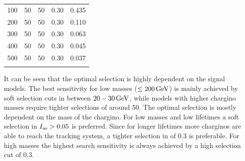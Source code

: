 \begin{table}[!h]
{\begin{tabular}{c |c| c| c| c}
\midrule
100&                     50&                      50&                      0.30&                    0.435\\ 
200&                     50&                      50&                      0.30&                    0.110\\ 
300&                     50&                      50&                      0.30&                    0.063\\ 
400&                     50&                      50&                      0.30&                    0.045\\ 
500&                     50&                      50&                      0.30&                    0.037\\ 
\bottomrule
\multicolumn{5}{c}{} \\
\end{tabular}}
\end{table}

It can be seen that the optimal selection is highly dependent on the signal models.
The best sensitivity for low masses ($\leq 200\,\text{Ge}\kern-0.06667em\text{V}$) is mainly achieved by soft selection cuts in \pt between $20-30\,\text{Ge}\kern-0.06667em\text{V}$, while models with higher chargino masses require tighter \pt selections of around 50\gev.
The optimal \ias selection is mostly dependent on the mass of the chargino.
For low masses and low lifetimes a soft selection in $I_{\text{as}}>0.05$ is preferred. 
Since for longer lifetimes more charginos are able to reach the tracking system, a tighter selection in \ias of 0.3 is preferable.
For high masses the highest search sensitivity is always achieved by a high \ias selection cut of 0.3.\\

